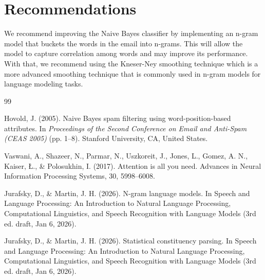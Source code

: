 \documentclass{acm_proc_article-sp}
\begin{document}
\section{Recommendations}
We recommend improving the Naive Bayes classifier by implementing an n-gram model that buckets the words in the email into n-grams. This will allow the model to capture correlation among words and may improve its performance. With that, we recommend using the Kneser-Ney smoothing technique which is a more advanced smoothing technique that is commonly used in n-gram models for language modeling tasks.
\begin{thebibliography}{99}

Hovold, J. (2005). Naive Bayes spam filtering using word-position-based attributes. In \textit{Proceedings of the Second Conference on Email and Anti-Spam (CEAS 2005)} (pp. 1--8). Stanford University, CA, United States.

Vaswani, A., Shazeer, N., Parmar, N., Uszkoreit, J., Jones, L., Gomez, A. N., Kaiser, Ł., \& Polosukhin, I. (2017). Attention is all you need. Advances in Neural Information Processing Systems, 30, 5998–6008.

Jurafsky, D., \& Martin, J. H. (2026). N-gram language models. In Speech and Language Processing: An Introduction to Natural Language Processing, Computational Linguistics, and Speech Recognition with Language Models (3rd ed. draft, Jan 6, 2026).

Jurafsky, D., \& Martin, J. H. (2026). Statistical constituency parsing. In Speech and Language Processing: An Introduction to Natural Language Processing, Computational Linguistics, and Speech Recognition with Language Models (3rd ed. draft, Jan 6, 2026).

\end{thebibliography}
\end{document}
